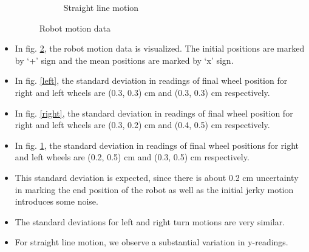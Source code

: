 \documentclass[11pt,a4paper,openright,twoside]{extreport}
\begin{document}
\begin{itemize}
\begin{figure}[H]
\begin{subfigure}[b]{0.45\textwidth}
\caption{Straight line motion}
\label{straight}
\end{subfigure}
\caption{Robot motion data}
\label{data}
\end{figure}

\item In fig. \ref{data}, the robot motion data is visualized. The initial positions are marked by `+' sign and the mean positions are marked by `x' sign.
\item In fig. \ref{left}, the standard deviation in readings of final wheel position for right and left wheels are (0.3, 0.3) cm and (0.3, 0.3) cm respectively.
\item In fig. \ref{right}, the standard deviation in readings of final wheel position for right and left wheels are (0.3, 0.2) cm and (0.4, 0.5) cm respectively.
\item In fig. \ref{straight}, the standard deviation in readings of final wheel positions for right and left wheels are (0.2, 0.5) cm and (0.3, 0.5) cm respectively.
\item This standard deviation is expected, since there is about 0.2 cm uncertainty in marking the end position of the robot as well as the initial jerky motion introduces some noise.
\item The standard deviations for left and right turn motions are very similar.
\item For straight line motion, we observe a substantial variation in y-readings.
\end{itemize}
\end{document}
